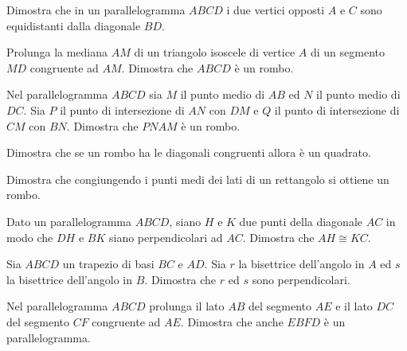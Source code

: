 \begin{multicols}{2}
\begin{esercizio}
\label{ese:4.19}
Dimostra che in un parallelogramma \(ABCD\) i due vertici opposti \(A\) e 
\(C\) sono equidistanti dalla diagonale \(BD\).
\end{esercizio}

\begin{esercizio}
\label{ese:4.20}
Prolunga la mediana \(AM\) di un triangolo isoscele di vertice \(A\) di 
un segmento \(MD\) congruente ad \(AM\). Dimostra che \(ABCD\) è un rombo.
\end{esercizio}

\begin{esercizio}
\label{ese:4.21}
Nel parallelogramma \(ABCD\) sia \(M\) il punto medio di \(AB\) ed \(N\) il 
punto medio di \(DC\). Sia \(P\) il punto di intersezione di \(AN\) con 
\(DM\) e \(Q\) il punto di intersezione di \(CM\) con \(BN\). Dimostra che 
\(PNAM\) è un rombo.
\end{esercizio}

\begin{esercizio}
\label{ese:4.22}
Dimostra che se un rombo ha le diagonali congruenti allora è un 
quadrato.
\end{esercizio}

\begin{esercizio}
\label{ese:4.23}
Dimostra che congiungendo i punti medi dei lati di un rettangolo si 
ottiene un rombo.
\end{esercizio}

\begin{esercizio}
\label{ese:4.24}
Dato un parallelogramma \(ABCD\), siano \(H\) e \(K\) due punti della 
diagonale \(AC\) in modo che \(DH\) e \(BK\) siano perpendicolari ad \(AC\). 
Dimostra che \(AH\cong KC\).
\end{esercizio}

\begin{esercizio}
\label{ese:4.25}
Sia \(ABCD\) un trapezio di basi \(BC\) e \(AD\). Sia \(r\) la bisettrice 
dell'angolo in \(A\) ed \(s\) la bisettrice dell'angolo in \(B\). Dimostra 
che \(r\) ed \(s\) sono perpendicolari.
\end{esercizio}

\begin{esercizio}
\label{ese:4.26}
Nel parallelogramma \(ABCD\) prolunga il lato \(AB\) del segmento \(AE\) e 
il lato \(DC\) del segmento \(CF\) congruente ad \(AE\). Dimostra che anche 
\(EBFD\) è un parallelogramma.
\end{esercizio}


\end{multicols}
